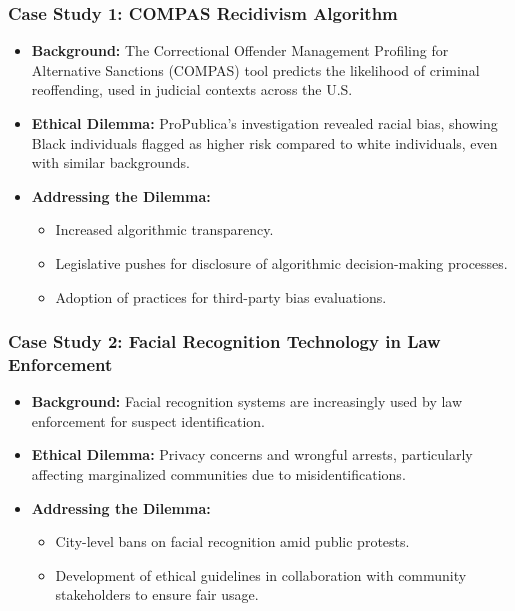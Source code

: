 \documentclass[aspectratio=169]{beamer}
\begin{document}
\begin{frame}[fragile]
  \frametitle{Case Study 1: COMPAS Recidivism Algorithm}
  \begin{itemize}
    \item \textbf{Background:} The Correctional Offender Management Profiling for Alternative Sanctions (COMPAS) tool predicts the likelihood of criminal reoffending, used in judicial contexts across the U.S.
    \item \textbf{Ethical Dilemma:} ProPublica's investigation revealed racial bias, showing Black individuals flagged as higher risk compared to white individuals, even with similar backgrounds.
    \item \textbf{Addressing the Dilemma:}
      \begin{itemize}
        \item Increased algorithmic transparency.
        \item Legislative pushes for disclosure of algorithmic decision-making processes.
        \item Adoption of practices for third-party bias evaluations.
      \end{itemize}
  \end{itemize}
\end{frame}

\begin{frame}[fragile]
  \frametitle{Case Study 2: Facial Recognition Technology in Law Enforcement}
  \begin{itemize}
    \item \textbf{Background:} Facial recognition systems are increasingly used by law enforcement for suspect identification.
    \item \textbf{Ethical Dilemma:} Privacy concerns and wrongful arrests, particularly affecting marginalized communities due to misidentifications.
    \item \textbf{Addressing the Dilemma:}
      \begin{itemize}
        \item City-level bans on facial recognition amid public protests.
        \item Development of ethical guidelines in collaboration with community stakeholders to ensure fair usage.
      \end{itemize}
  \end{itemize}
\end{frame}
\end{document}
